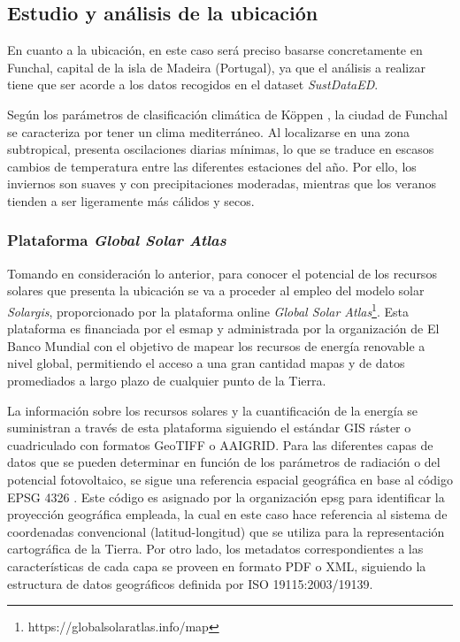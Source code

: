 \subsection{Estudio y análisis de la ubicación}

En cuanto a la ubicación, en este caso será preciso basarse concretamente en Funchal, capital de la isla de Madeira (Portugal), ya que el análisis a realizar tiene que ser acorde a los datos recogidos en el dataset \textit{SustDataED}.

\vspace{3mm}

Según los parámetros de clasificación climática de Köppen \cite{koppen}, la ciudad de Funchal se caracteriza por tener un clima mediterráneo. Al localizarse en una zona subtropical, presenta oscilaciones diarias mínimas, lo que se traduce en escasos cambios de temperatura entre las diferentes estaciones del año. Por ello, los inviernos son suaves y con precipitaciones moderadas, mientras que los veranos tienden a ser ligeramente más cálidos y secos. 

\subsubsection{Plataforma \textit{Global Solar Atlas}}

Tomando en consideración lo anterior, para conocer el potencial de los recursos solares que presenta la ubicación se va a proceder al empleo del modelo solar \textit{Solargis}, proporcionado por la plataforma online \textit{Global Solar Atlas}\footnote{https://globalsolaratlas.info/map}. Esta plataforma es financiada por el \gls{esmap} y administrada por la organización de El Banco Mundial con el objetivo de mapear los recursos de energía renovable a nivel global, permitiendo el acceso a una gran cantidad mapas y de datos promediados a largo plazo de cualquier punto de la Tierra. \cite{globalsolar} \cite{energydata}

\vspace{3mm}

La información sobre los recursos solares y la cuantificación de la energía se suministran a través de esta plataforma siguiendo el estándar GIS ráster o cuadriculado con formatos GeoTIFF o AAIGRID. Para las diferentes capas de datos que se pueden determinar en función de los parámetros de radiación o del potencial fotovoltaico, se sigue una referencia espacial geográfica en base al código EPSG 4326 \cite{epsg}. Este código es asignado por la organización \gls{epsg} para identificar la proyección geográfica empleada, la cual en este caso hace referencia al sistema de coordenadas convencional (latitud-longitud) que se utiliza para la representación cartográfica de la Tierra. Por otro lado, los metadatos correspondientes a las características de cada capa se proveen en formato PDF o XML, siguiendo la estructura de datos geográficos definida por ISO 19115:2003/19139.~\cite{globalsolar} \cite{globalsolarreport}

